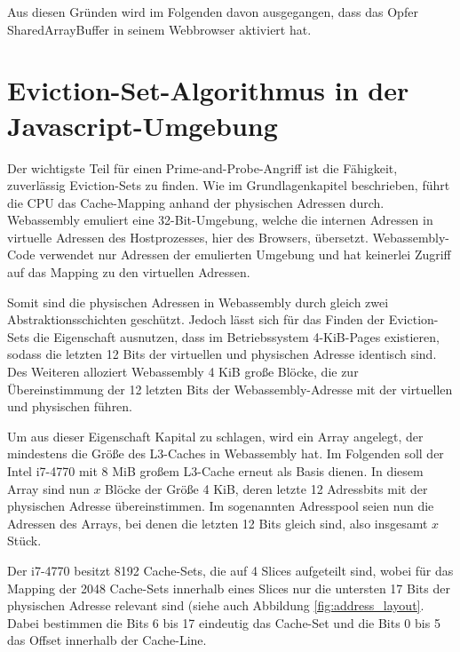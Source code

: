 Aus diesen Gründen wird im Folgenden davon ausgegangen, dass das Opfer SharedArrayBuffer in seinem Webbrowser aktiviert hat.


\section{Eviction-Set-Algorithmus in der Javascript-Umgebung}
Der wichtigste Teil für einen Prime-and-Probe-Angriff ist die Fähigkeit, zuverlässig Eviction-Sets zu finden. Wie im Grundlagenkapitel beschrieben, führt die CPU das Cache-Mapping anhand der physischen Adressen durch. Webassembly emuliert eine 32-Bit-Umgebung, welche die internen Adressen in virtuelle Adressen des Hostprozesses, hier des Browsers, übersetzt. 
Webassembly-Code verwendet nur Adressen der emulierten Umgebung und hat keinerlei Zugriff auf das Mapping zu den virtuellen Adressen. 

Somit sind die physischen Adressen in Webassembly durch gleich zwei Abstraktionsschichten geschützt. 
Jedoch lässt sich für das Finden der Eviction-Sets die Eigenschaft ausnutzen, dass im Betriebssystem 4-KiB-Pages existieren, sodass die letzten 12 Bits der virtuellen und physischen Adresse identisch sind. 
Des Weiteren alloziert %
Webassembly 4 KiB große Blöcke, die zur Übereinstimmung der 12 letzten Bits der Webassembly-Adresse mit der virtuellen und physischen führen.

Um aus dieser Eigenschaft Kapital zu schlagen, wird ein Array angelegt, der mindestens die Größe des L3-Caches in Webassembly hat. Im Folgenden soll der Intel i7-4770 mit 8 MiB großem L3-Cache erneut als Basis dienen. In diesem Array sind nun $x$ Blöcke der Größe 4 KiB, deren letzte 12 Adressbits mit der physischen Adresse übereinstimmen. Im sogenannten Adresspool seien nun die Adressen des Arrays, bei denen die letzten 12 Bits gleich sind, also insgesamt $x$ Stück.

Der i7-4770 besitzt 8192 Cache-Sets, die auf 4 Slices aufgeteilt sind, wobei für das Mapping der 2048 Cache-Sets innerhalb eines Slices nur die untersten 17 Bits der physischen Adresse relevant sind (siehe auch Abbildung \ref{fig:address_layout}. Dabei bestimmen die Bits 6 bis 17 eindeutig das Cache-Set und die Bits 0 bis 5 das Offset innerhalb der Cache-Line.

